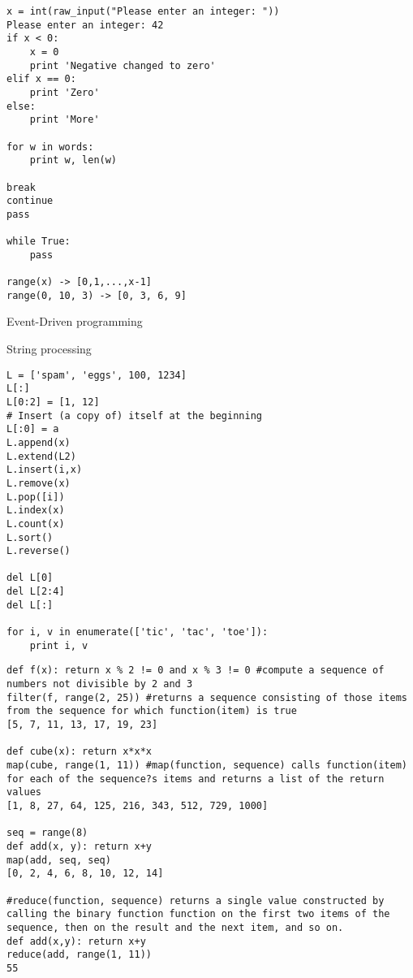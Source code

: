 \documentclass[9pt]{amsart}
\begin{document}
\begin{multicols}{2}
\noindent {\textcolor {blue} {\em Logic and Control}}  

\begin{lstlisting}
x = int(raw_input("Please enter an integer: "))
Please enter an integer: 42
if x < 0:
	x = 0
	print 'Negative changed to zero'
elif x == 0:
	print 'Zero'
else:
	print 'More'
	
for w in words:
	print w, len(w)
	
break
continue
pass

while True:
	pass
	
range(x) -> [0,1,...,x-1]
range(0, 10, 3) -> [0, 3, 6, 9]

\end{lstlisting}

Event-Driven programming

String processing

\noindent {\textcolor {blue} {\em Lists \& List Menthods}} 

\begin{lstlisting}
L = ['spam', 'eggs', 100, 1234]
L[:]
L[0:2] = [1, 12]
# Insert (a copy of) itself at the beginning
L[:0] = a
L.append(x)
L.extend(L2)
L.insert(i,x)
L.remove(x)
L.pop([i])
L.index(x)
L.count(x)
L.sort()
L.reverse()

del L[0]
del L[2:4]
del L[:]

for i, v in enumerate(['tic', 'tac', 'toe']):
	print i, v
\end{lstlisting}

\noindent {\textcolor {blue} {\em Functional Programming Tools}}

\begin{lstlisting}
def f(x): return x % 2 != 0 and x % 3 != 0 #compute a sequence of numbers not divisible by 2 and 3
filter(f, range(2, 25)) #returns a sequence consisting of those items from the sequence for which function(item) is true
[5, 7, 11, 13, 17, 19, 23]

def cube(x): return x*x*x
map(cube, range(1, 11)) #map(function, sequence) calls function(item) for each of the sequence?s items and returns a list of the return values
[1, 8, 27, 64, 125, 216, 343, 512, 729, 1000]

seq = range(8)
def add(x, y): return x+y
map(add, seq, seq)
[0, 2, 4, 6, 8, 10, 12, 14]

#reduce(function, sequence) returns a single value constructed by calling the binary function function on the first two items of the sequence, then on the result and the next item, and so on.
def add(x,y): return x+y
reduce(add, range(1, 11))
55
\end{lstlisting}


\end{multicols}
\end{document}
